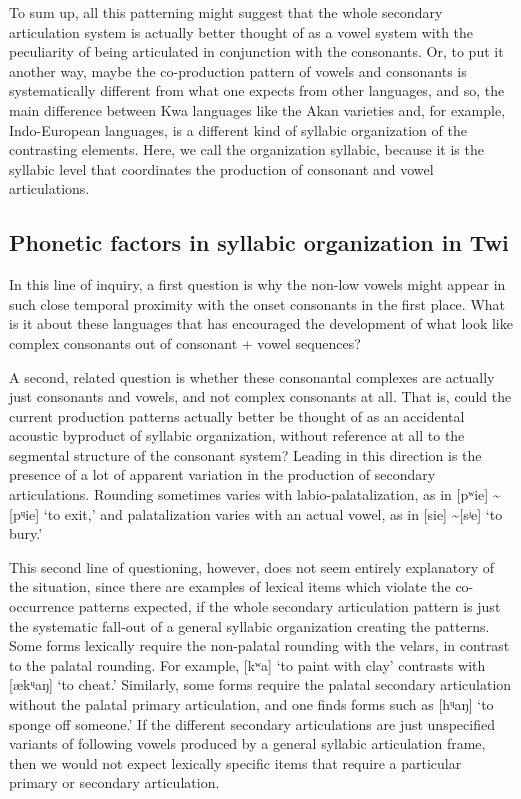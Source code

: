 \documentclass[output=paper,colorlinks,citecolor=brown]{langscibook}
\begin{document}
To sum up, all this patterning might suggest that the whole secondary articulation system is actually better thought of as a vowel system with the peculiarity of being articulated in conjunction with the consonants. Or, to put it another way, maybe the co-production pattern of vowels and consonants is systematically different from what one expects from other languages, and so, the main difference between Kwa languages like the Akan varieties and, for example, Indo-European languages, is a different kind of syllabic organization of the contrasting elements. Here, we call the organization syllabic, because it is the syllabic level that coordinates the production of consonant and vowel articulations. 

\subsection{Phonetic factors in syllabic organization in Twi}

In this line of inquiry, a first question is why the non-low vowels might appear in such close temporal proximity with the onset consonants in the first place. What is it about these languages that has encouraged the development of what look like complex consonants out of consonant + vowel sequences?

A second, related question is whether these consonantal complexes are actually just consonants and vowels, and not complex consonants at all. That is, could the current production patterns actually better be thought of as an accidental acoustic byproduct of syllabic organization, without reference at all to the segmental structure of the consonant system? Leading in this direction is the presence of a lot of apparent variation in the production of secondary articulations. Rounding sometimes varies with labio-palatalization, as in [pʷie] \sim [pᶣie] ‘to exit,’ and palatalization varies with an actual vowel, as in [sie] \sim [sʲe] ‘to bury.’ 

This second line of questioning, however, does not seem entirely explanatory of the situation, since there are examples of lexical items which violate the co-occurrence patterns expected, if the whole secondary articulation pattern is just the systematic fall-out of a general syllabic organization creating the patterns. Some forms lexically require the non-palatal rounding with the velars, in contrast to the palatal rounding. For example, [kʷa] ‘to paint with clay’ contrasts with [ækᶣaŋ] ‘to cheat.' Similarly, some forms require the palatal secondary articulation without the palatal primary articulation, and one finds forms such as [hᶣaŋ] ‘to sponge off someone.’ If the different secondary articulations are just unspecified variants of following vowels produced by a general syllabic articulation frame, then we would not expect lexically specific items that require a particular primary or secondary articulation. 
\end{document}

